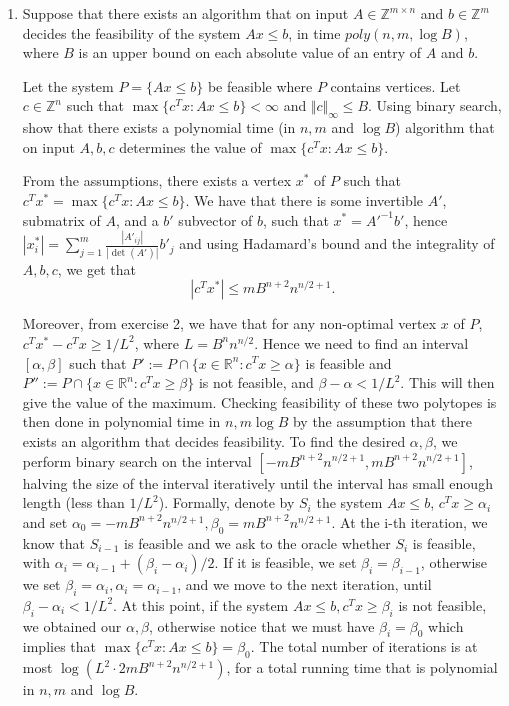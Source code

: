 \documentclass[11pt]{article}
\newcommand{\setR}{\mathbb{R}}
\newcommand{\setZ}{\mathbb{Z}}
\renewcommand{\leq}{\leqslant}
\begin{document}
\begin{enumerate}[1)]
\item Suppose that there exists an algorithm that on input $A ∈\setZ^{m×n}$ and $b ∈\setZ^m$ decides
the feasibility of the system $Ax≤b$, in time $poly(n,m,\log B)$, where $B$ is an upper bound on each
absolute value of an entry of $A$ and $b$. 


Let the system $P = \{Ax ≤b\}$ be feasible where $P$ contains vertices. Let $c ∈\setZ^n$ such that $\max\{c^Tx : Ax ≤b\}< \infty$ and $\Vert c \Vert_\infty \leq B$. Using binary search, show that there exists a polynomial time (in $n,m$ and $\log B$) algorithm that on input $A,b,c$ determines the value of $\max\{c^Tx: Ax≤b\}$.


\begin{solution}
From the assumptions, there exists a vertex $x^*$ of $P$ such that $c^Tx^*= \max\{c^Tx: Ax≤b\}$.
We have that there is some invertible $A'$, submatrix of $A$, and a $b'$ subvector of $b$, such that
$x^*=  {A'}^{−1}b'$, hence $|x^\ast_i|= \sum_{j =1}^m \frac{|A'_{ij}|}{|\det(A')|}b'_j$ and using Hadamard's bound and the integrality of $A,b,c$, we get that 
$$|c^Tx^\ast|≤ mB^{n+2}n^{n/2+1}.$$

Moreover, from exercise 2, we have that for any non-optimal vertex $x$ of $P$,  $c^Tx^*−c^Tx≥1/L^2$, where
$L= B^n n^{n/2}$. Hence we need to find an interval $[α,β]$ such that $P' := P ∩\{x∈\setR^n : c^Tx≥α\}$ is feasible and $P'' := P ∩\{x∈\setR^n : c^Tx≥β\}$ is not feasible, and $β−α <1/L^2$. This will then give the value of the maximum. Checking feasibility of these two polytopes is then done in polynomial time in $n, m \log B$ by the assumption that there exists an algorithm that decides feasibility. To find the desired $α,β$, we perform binary search on the interval $[−mB^{n+2}n^{n/2+1},mB^{n+2}n^{n/2+1}]$, halving the size of the interval iteratively until the interval has small enough length (less than $1/L^2$). Formally, denote by $S_i$ the system $Ax ≤ b$, $c^Tx ≥ α_i$ and set $α_0 =−mB^{n+2}n^{n/2+1},β_0 = mB^{n+2}n^{n/2+1}$. At the i-th iteration, we know that $S_{i−1}$ is feasible and we ask to the oracle whether $S_i$ is feasible, with $α_i = α_{i−1} + (β_i−α_i)/2$. If it is feasible, we set $β_i = β_{i−1}$, otherwise we set $β_i = α_i,α_i = α_{i−1}$, and we move to the next iteration, until $β_i−α_i <1/L^2$. At this point, if the system $Ax≤b,c^Tx≥β_i$ is not feasible, we obtained our $α,β$, otherwise notice that we must have $β_i = β_0$ which implies that $\max\{c^Tx: Ax≤b\}= β_0$. The total number of iterations is at most $\log(L^2\cdot 2mB^{n+2}n^{n/2+1})$, for a total running time that is polynomial in $n, m$ and $\log B$.


\end{solution}



\end{enumerate}



  
\end{document}
